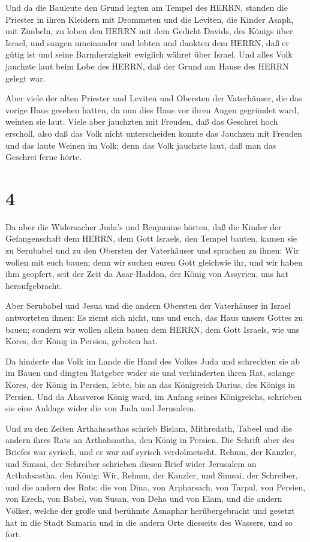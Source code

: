  Und da die Bauleute den Grund legten am Tempel des HERRN,
standen die Priester in ihren Kleidern mit Drommeten und die Leviten,
die Kinder Asaph, mit Zimbeln, zu loben den HERRN mit dem Gedicht
Davids, des Königs über Israel,  und sangen umeinander und
lobten und dankten dem HERRN, daß er gütig ist und seine Barmherzigkeit
ewiglich währet über Israel. Und alles Volk jauchzte laut beim Lobe des
HERRN, daß der Grund am Hause des HERRN gelegt war.

 Aber viele der alten Priester und Leviten und Obersten der
Vaterhäuser, die das vorige Haus gesehen hatten, da nun dies Haus vor
ihren Augen gegründet ward, weinten sie laut. Viele aber jauchzten mit
Freuden, daß das Geschrei hoch erscholl,  also daß das Volk
nicht unterscheiden konnte das Jauchzen mit Freuden und das laute Weinen
im Volk; denn das Volk jauchzte laut, daß man das Geschrei ferne hörte.

\hypertarget{section-3}{%
\section{4}\label{section-3}}

 Da aber die Widersacher Juda's und Benjamins hörten, daß
die Kinder der Gefangenschaft dem HERRN, dem Gott Israels, den Tempel
bauten,  kamen sie zu Serubabel und zu den Obersten der
Vaterhäuser und sprachen zu ihnen: Wir wollen mit euch bauen; denn wir
suchen euren Gott gleichwie ihr, und wir haben ihm geopfert, seit der
Zeit da Asar-Haddon, der König von Assyrien, uns hat heraufgebracht.

 Aber Serubabel und Jesua und die andern Obersten der
Vaterhäuser in Israel antworteten ihnen: Es ziemt sich nicht, uns und
euch, das Haus unsers Gottes zu bauen; sondern wir wollen allein bauen
dem HERRN, dem Gott Israels, wie uns Kores, der König in Persien,
geboten hat.

 Da hinderte das Volk im Lande die Hand des Volkes Juda und
schreckten sie ab im Bauen  und dingten Ratgeber wider sie
und verhinderten ihren Rat, solange Kores, der König in Persien, lebte,
bis an das Königreich Darius, des Königs in Persien.  Und da
Ahasveros König ward, im Anfang seines Königreichs, schrieben sie eine
Anklage wider die von Juda und Jerusalem.

 Und zu den Zeiten Arthahsasthas schrieb Bislam, Mithredath,
Tabeel und die andern ihres Rats an Arthahsastha, den König in Persien.
Die Schrift aber des Briefes war syrisch, und er war auf syrisch
verdolmetscht.  Rehum, der Kanzler, und Simsai, der
Schreiber schrieben diesen Brief wider Jerusalem an Arthahsastha, den
König:  Wir, Rehum, der Kanzler, und Simsai, der Schreiber,
und die andern des Rats: die von Dina, von Arpharsach, von Tarpal, von
Persien, von Erech, von Babel, von Susan, von Deha und von Elam,
 und die andern Völker, welche der große und berühmte
Asnaphar herübergebracht und gesetzt hat in die Stadt Samaria und in die
andern Orte diesseits des Wassers, und so fort.

